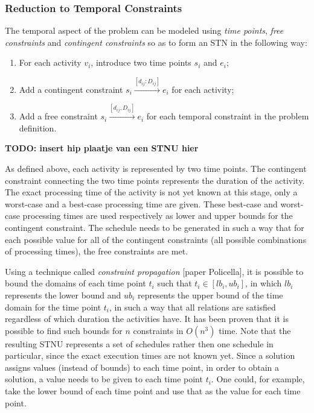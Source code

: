 \documentclass{article}
\newcommand{\TODO}[1]{{\color{red}\textbf{TODO: #1}}}
\begin{document}
\subsubsection{Reduction to Temporal Constraints}
The temporal aspect of the problem can be modeled using \emph{time points}, \emph{free constraints} and \emph{contingent constraints} so as to form an STN in the following way:
\begin{enumerate}
\item For each activity $v_i$, introduce two time points $s_i$ and $e_i$;
\item Add a contingent constraint $s_i \xrightarrow{[d_{ij}:D_{ij}]} e_i$ for each activity;
\item Add a free constraint $s_i \xrightarrow{[d_{ij},D_{ij}]} e_i$ for each temporal constraint in the problem definition.
\end{enumerate}

\TODO{insert hip plaatje van een STNU hier}

As defined above, each activity is represented by two time points. The contingent constraint connecting the two time points represents the duration of the activity. The exact processing time of the activity is not yet known at this stage, only a worst-case and a best-case processing time are given. These best-case and worst-case processing times are used respectively as lower and upper bounds for the contingent constraint. The schedule needs to be generated in such a way that for each possible value for all of the contingent constraints (all possible combinations of processing times), the free constraints are met.

Using a technique called \emph{constraint propagation} [paper Policella], it is possible to bound the domains of each time point $t_i$ such that $t_i \in [lb_i, ub_i]$, in which $lb_i$ represents the lower bound and $ub_i$ represents the upper bound of the time domain for the time point $t_i$, in such a way that all relations are satisfied regardless of which duration the activities have. It has been proven that it is possible to find such bounds for $n$ constraints in $O(n^3)$ time. Note that the resulting STNU represents a set of schedules rather then one schedule in particular, since the exact execution times are not known yet. Since a solution assigns values (instead of bounds) to each time point, in order to obtain a solution, a value needs to be given to each time point $t_i$. One could, for example, take the lower bound of each time point and use that as the value for each time point.
\end{document}
